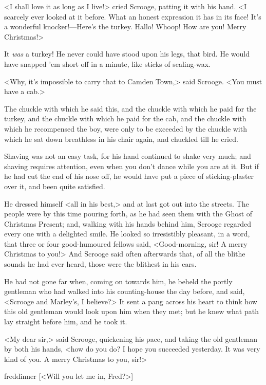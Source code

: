 <I shall love it as long as I live!> cried Scrooge, patting it with his hand. <I
scarcely ever looked at it before. What an honest expression it has in its face!
It's a wonderful knocker!—Here's the turkey. Hallo! Whoop! How are you! Merry
Christmas!>

It \emph{was} a turkey! He never could have stood upon his legs, that bird. He
would have snapped 'em short off in a minute, like sticks of sealing-wax.

<Why, it's impossible to carry that to Camden Town,> said Scrooge. <You must
have a cab.>

The chuckle with which he said this, and the chuckle with which he paid for the
turkey, and the chuckle with which he paid for the cab, and the chuckle with
which he recompensed the boy, were only to be exceeded by the chuckle with which
he sat down breathless in his chair again, and chuckled till he cried.

Shaving was not an easy task, for his hand continued to shake very much; and
shaving requires attention, even when you don't dance while you are at it. But
if he had cut the end of his nose off, he would have put a piece of
sticking-plaster over it, and been quite satisfied.

He dressed himself <all in his best,> and at last got out into the streets. The
people were by this time pouring forth, as he had seen them with the Ghost of
Christmas Present; and, walking with his hands behind him, Scrooge regarded
every one with a delighted smile. He looked so irresistibly pleasant, in a word,
that three or four good-humoured fellows said, <Good-morning, sir! A merry
Christmas to you!> And Scrooge said often afterwards that, of all the blithe
sounds he had ever heard, those were the blithest in his ears.

He had not gone far when, coming on towards him, he beheld the portly gentleman
who had walked into his counting-house the day before, and said, <Scrooge and
Marley's, I believe?> It sent a pang across his heart to think how this old
gentleman would look upon him when they met; but he knew what path lay straight
before him, and he took it.

<My dear sir,> said Scrooge, quickening his pace, and taking the old gentleman
by both his hands, <how do you do? I hope you succeeded yesterday. It was very
kind of you. A merry Christmas to you, sir!>

  \begin{colorbigpic}
    [\basicscale] 
    {freddinner}
    [<Will you let me in, Fred?>]
  \end{colorbigpic}


